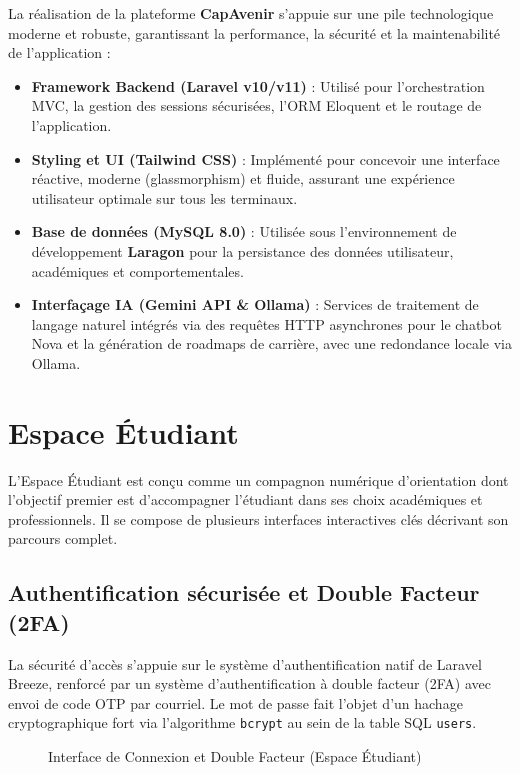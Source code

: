 La réalisation de la plateforme \textbf{CapAvenir} s'appuie sur une pile technologique moderne et robuste, garantissant la performance, la sécurité et la maintenabilité de l'application :
\begin{itemize}
    \item \textbf{Framework Backend (Laravel v10/v11)} : Utilisé pour l'orchestration MVC, la gestion des sessions sécurisées, l'ORM Eloquent et le routage de l'application.
    \item \textbf{Styling et UI (Tailwind CSS)} : Implémenté pour concevoir une interface réactive, moderne (glassmorphism) et fluide, assurant une expérience utilisateur optimale sur tous les terminaux.
    \item \textbf{Base de données (MySQL 8.0)} : Utilisée sous l'environnement de développement \textbf{Laragon} pour la persistance des données utilisateur, académiques et comportementales.
    \item \textbf{Interfaçage IA (Gemini API \& Ollama)} : Services de traitement de langage naturel intégrés via des requêtes HTTP asynchrones pour le chatbot Nova et la génération de roadmaps de carrière, avec une redondance locale via Ollama.
\end{itemize}

\section{Espace Étudiant}

L'Espace Étudiant est conçu comme un compagnon numérique d'orientation dont l'objectif premier est d'accompagner l'étudiant dans ses choix académiques et professionnels. Il se compose de plusieurs interfaces interactives clés décrivant son parcours complet.

\subsection{Authentification sécurisée et Double Facteur (2FA)}

La sécurité d'accès s'appuie sur le système d'authentification natif de Laravel Breeze, renforcé par un système d'authentification à double facteur (2FA) avec envoi de code OTP par courriel. Le mot de passe fait l'objet d'un hachage cryptographique fort via l'algorithme \texttt{bcrypt} au sein de la table SQL \texttt{users}.

\begin{figure}[H]
    \centering
    \caption{Interface de Connexion et Double Facteur (Espace Étudiant)}
    \label{fig:interface_authentification_etudiant}
\end{figure}

